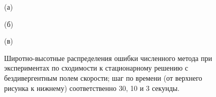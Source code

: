 \documentclass[14pt, a4paper]{extarticle}
\begin{document}
\begin{figure}[H]

(а) 

\end{figure}

\begin{figure}[H]

(б)

\end{figure}

\begin{figure}[H]

(в)

\caption{Широтно-высотные распределения ошибки численного метода при экспериментах по сходимости к стационарному решению с бездивергентным полем скорости; шаг по времени (от верхнего рисунка к нижнему) соответственно 30, 10 и 3 секунды.}
\end{figure}
\end{document}
